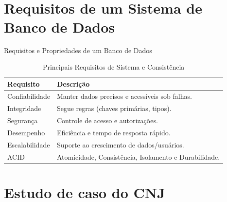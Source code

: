 \documentclass[9pt]{beamer}
\begin{document}
\section{Requisitos de um Sistema de Banco de Dados}

\begin{frame}{Requisitos e Propriedades de um Banco de Dados}
    \begin{table}
        \centering
        \caption{Principais Requisitos de Sistema e Consistência}
        \renewcommand{\arraystretch}{1.2}
        \begin{tabular}{|l|p{6cm}|} %
            \hline
            \textbf{Requisito} & \textbf{Descrição} \\ \hline
            Confiabilidade & Manter dados precisos e acessíveis sob falhas. \\ \hline
            Integridade    & Segue regras (chaves primárias, tipos). \\ \hline
            Segurança      & Controle de acesso e autorizações. \\ \hline
            Desempenho     & Eficiência e tempo de resposta rápido. \\ \hline
            Escalabilidade & Suporte ao crescimento de dados/usuários. \\ \hline
            ACID           & Atomicidade, Consistência, Isolamento e Durabilidade. \\ \hline
        \end{tabular}
    \end{table}
\end{frame}
\section{Estudo de caso do CNJ}
\end{document}
